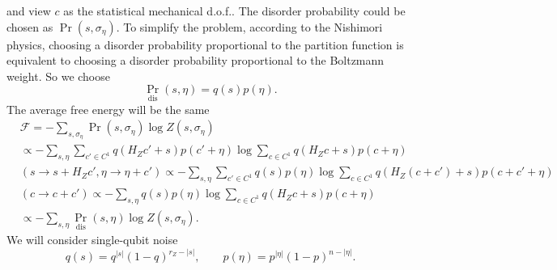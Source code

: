 \documentclass[twoside,english,aps,showpacs,pra,superscriptaddress]{revtex4-2}
\begin{document}
and view $c$ as the statistical mechanical d.o.f.. The disorder probability could be chosen as $\Pr(s,\sigma_\eta)$. To simplify the problem, according to the Nishimori physics, choosing a disorder probability proportional to the partition function is equivalent to choosing a disorder probability proportional to the Boltzmann weight. So we choose
\begin{equation}
    \Pr_{\text{dis}}(s,\eta) = q(s)p(\eta).
\end{equation}
The average free energy will be the same
\begin{equation}
\begin{aligned}
    &\mathcal F = - \sum_{s,\sigma_\eta} \Pr(s,\sigma_\eta)\log Z(s,\sigma_\eta)\\
    & \propto - \sum_{s,\eta} \sum_{c'\in C^1} q(H_Z c' +s)p(c'+\eta)\log \sum_{c\in C^1} q(H_Z c +s)p(c+\eta)\\
    &(s\rightarrow s+H_Z c',\eta\rightarrow \eta+c') \propto - \sum_{s,\eta} \sum_{c'\in C^1} q( s)p(\eta)\log \sum_{c\in C^1} q(H_Z (c+c') +s)p(c+c'+\eta)\\
    &(c\rightarrow c+c') \propto - \sum_{s,\eta}  q( s)p(\eta)\log \sum_{c\in C^1} q(H_Z c +s)p(c+\eta)\\
    &\propto - \sum_{s,\eta} \Pr_{\text{dis}}(s,\eta)\log Z(s,\sigma_\eta).
\end{aligned}
\end{equation}
We will consider single-qubit noise
\begin{equation}
    q(s) = q^{|s|}(1-q)^{r_Z-|s|}, \qquad p(\eta) = p^{|\eta|}(1-p)^{n-|\eta|}.
\end{equation}
\end{document}

